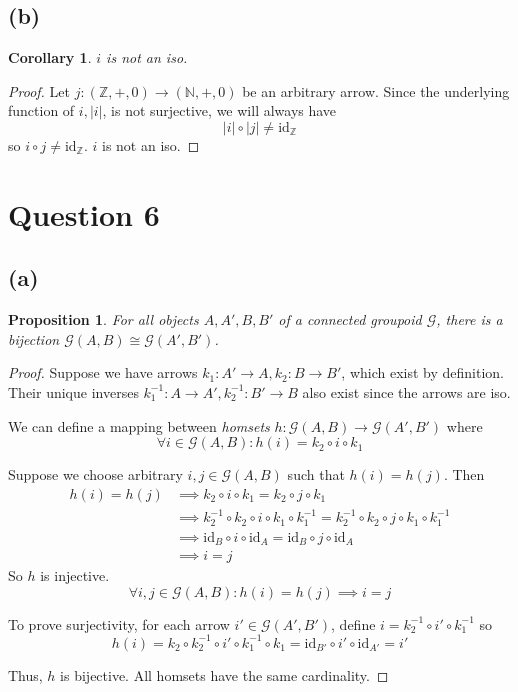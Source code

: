 \documentclass[11pt]{article} %
\newtheorem{corollary}[theorem]{Corollary}
\newtheorem{proposition}[theorem]{Proposition}
\theoremstyle{definition}
\begin{document}
\subsection*{(b)}
\begin{corollary}
    $i$ is not an iso.
\end{corollary}
\begin{proof}
    Let $j:(\mathbb{Z},+,0)\rightarrow (\mathbb{N},+,0)$ be an arbitrary arrow.
    Since the underlying function of $i, |i|$, is not surjective, 
    we will always have 
    \[|i|\circ|j|\neq\text{id}_{\mathbb{Z}}\]
    so $i\circ j \neq \text{id}_{\mathbb{Z}}$.
    $i$ is not an iso.
\end{proof}


\section*{Question 6}
\addtocounter{section}{1}
\subsection*{(a)}
\begin{proposition}
    For all objects $A,A',B,B'$ of a connected groupoid $\mathcal{G}$, 
    there is a bijection $\mathcal{G}(A,B)\cong\mathcal{G}(A',B')$.
\end{proposition}
\begin{proof}
    Suppose we have arrows $k_1:A'\rightarrow A,k_2:B \rightarrow B'$, which exist by definition.
    Their unique inverses $k_1^{-1}:A\rightarrow A',k_2^{-1}:B' \rightarrow B$ also exist since the arrows are iso.

    We can define a mapping between \textit{homsets} $h:\mathcal{G}(A,B)\rightarrow \mathcal{G}(A',B')$ where
    \[\forall i\in\mathcal{G}(A,B):h(i)=k_2\circ i\circ k_1\]

    Suppose we choose arbitrary $i,j \in \mathcal{G}(A,B)$ such that $h(i)=h(j)$. Then
\begin{equation}
\begin{aligned}
    h(i)=h(j) &\implies k_2\circ i \circ k_1 = k_2\circ j\circ k_1\\
    &\implies k_2^{-1}\circ k_2\circ i \circ k_1 \circ k_1^{-1}= k_2^{-1}\circ k_2\circ j\circ k_1\circ k_1^{-1}\\
    &\implies \text{id}_B\circ i \circ \text{id}_A = \text{id}_B\circ j\circ \text{id}_A\\
    &\implies i=j
\end{aligned}
\end{equation}
    So $h$ is injective.
    \[\forall i,j \in \mathcal{G}(A,B):h(i)=h(j) \implies i=j\]

    To prove surjectivity, for each arrow $i'\in\mathcal{G}(A',B')$, define $i=k_2^{-1}\circ i' \circ k_1^{-1}$ so
    \[h(i)=k_2\circ k_2^{-1}\circ i' \circ k_1^{-1} \circ k_1 
    = \text{id}_{B'}\circ i' \circ \text{id}_{A'} = i'\]

    Thus, $h$ is bijective. All homsets have the same cardinality.
\end{proof}
\end{document}
